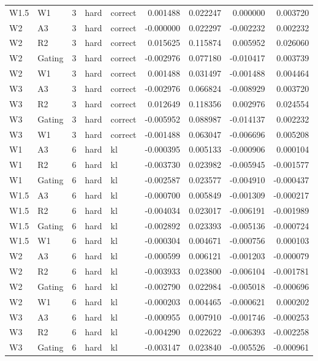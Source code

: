 \begin{tabular}{llrllrrrr}
W1.5 & W1 & 3 & hard & correct & 0.001488 & 0.022247 & 0.000000 & 0.003720 \\
W2 & A3 & 3 & hard & correct & -0.000000 & 0.022297 & -0.002232 & 0.002232 \\
W2 & R2 & 3 & hard & correct & 0.015625 & 0.115874 & 0.005952 & 0.026060 \\
W2 & Gating & 3 & hard & correct & -0.002976 & 0.077180 & -0.010417 & 0.003739 \\
W2 & W1 & 3 & hard & correct & 0.001488 & 0.031497 & -0.001488 & 0.004464 \\
W3 & A3 & 3 & hard & correct & -0.002976 & 0.066824 & -0.008929 & 0.003720 \\
W3 & R2 & 3 & hard & correct & 0.012649 & 0.118356 & 0.002976 & 0.024554 \\
W3 & Gating & 3 & hard & correct & -0.005952 & 0.088987 & -0.014137 & 0.002232 \\
W3 & W1 & 3 & hard & correct & -0.001488 & 0.063047 & -0.006696 & 0.005208 \\
W1 & A3 & 6 & hard & kl & -0.000395 & 0.005133 & -0.000906 & 0.000104 \\
W1 & R2 & 6 & hard & kl & -0.003730 & 0.023982 & -0.005945 & -0.001577 \\
W1 & Gating & 6 & hard & kl & -0.002587 & 0.023577 & -0.004910 & -0.000437 \\
W1.5 & A3 & 6 & hard & kl & -0.000700 & 0.005849 & -0.001309 & -0.000217 \\
W1.5 & R2 & 6 & hard & kl & -0.004034 & 0.023017 & -0.006191 & -0.001989 \\
W1.5 & Gating & 6 & hard & kl & -0.002892 & 0.023393 & -0.005136 & -0.000724 \\
W1.5 & W1 & 6 & hard & kl & -0.000304 & 0.004671 & -0.000756 & 0.000103 \\
W2 & A3 & 6 & hard & kl & -0.000599 & 0.006121 & -0.001203 & -0.000079 \\
W2 & R2 & 6 & hard & kl & -0.003933 & 0.023800 & -0.006104 & -0.001781 \\
W2 & Gating & 6 & hard & kl & -0.002790 & 0.022984 & -0.005018 & -0.000696 \\
W2 & W1 & 6 & hard & kl & -0.000203 & 0.004465 & -0.000621 & 0.000202 \\
W3 & A3 & 6 & hard & kl & -0.000955 & 0.007910 & -0.001746 & -0.000253 \\
W3 & R2 & 6 & hard & kl & -0.004290 & 0.022622 & -0.006393 & -0.002258 \\
W3 & Gating & 6 & hard & kl & -0.003147 & 0.023840 & -0.005526 & -0.000961 \\

\end{tabular}
